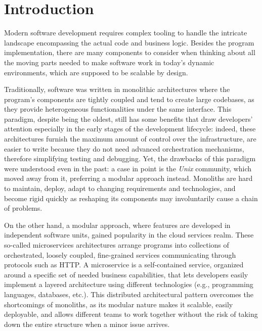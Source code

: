\chapter{Introduction}
\label{chap:introduction}
Modern software development requires complex tooling to handle
the intricate landscape encompassing the actual code and business logic.
Besides the program implementation, there are many components to consider
when thinking about all the moving parts needed to make software work
in today's dynamic environments, which are supposed to be scalable by design.

Traditionally, software was written in monolithic architectures where
the program's components are tightly coupled and tend to create
large codebases, as they provide heterogeneous functionalities under the same interface.
This paradigm, despite being the oldest, still has some benefits that
draw developers' attention especially in the early stages of the development lifecycle:
indeed, these architectures furnish the maximum amount of control over the infrastructure,
are easier to write because they do not need advanced orchestration mechanisms,
therefore simplifying testing and debugging.
Yet, the drawbacks of this paradigm were understood even in the past:
a case in point is the \textit{Unix} community, which moved away from it,
preferring a modular approach instead. Monoliths are hard to maintain, deploy,
adapt to changing requirements and technologies, and
become rigid quickly as reshaping its components may involuntarily cause a chain of problems.

On the other hand, a modular approach, where features are developed in
independent software units, gained popularity in the cloud services realm.
These so-called microservices architectures arrange
programs into collections of orchestrated, loosely coupled, fine-grained services
communicating through protocols such as HTTP.
A microservice is a self-contained service, organized around a specific set
of needed business capabilities, that lets developers easily implement a layered architecture
using different technologies (e.g., programming languages, databases, etc.).
This distributed architectural pattern overcomes the shortcomings of monoliths,
as its modular nature makes it scalable, easily deployable, and allows different teams
to work together without the risk of taking down the entire structure when a minor issue arrives.

